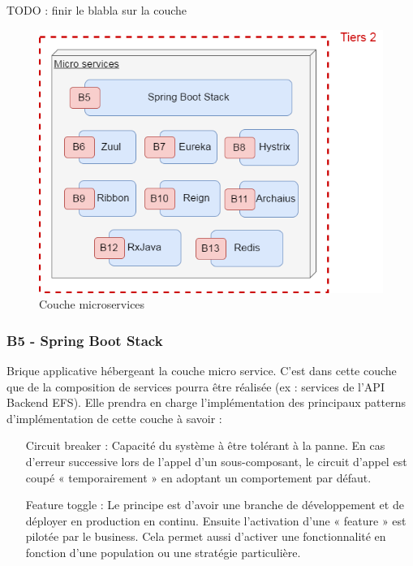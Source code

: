 	TODO : finir le blabla sur la couche
	
\begin{figure}[H]
	\includegraphics[scale=0.5]{images/travailNeuflizeOBC/architecture/coucheMicroservices.png}
	\centering
	\caption{Couche microservices}
	\label{coucheMicroservices}
\end{figure}

	\subsubsection{B5 - Spring Boot Stack}
	
Brique applicative hébergeant la couche micro service. C’est dans cette couche que de la composition de services pourra être réalisée (ex : services de l’API Backend EFS). Elle prendra en charge l’implémentation des principaux patterns d’implémentation de cette couche à savoir :
\begin{itemize}
	\item[Circuit breaker] : Capacité du système à être tolérant à la panne. En cas d’erreur successive lors de l’appel d’un sous-composant, le circuit d’appel est coupé « temporairement » en adoptant un comportement par défaut. 
	\item[Feature toggle] : Le principe est d’avoir une branche de développement et de déployer en production en continu. Ensuite l’activation d’une « feature » est pilotée par le business. Cela permet aussi d’activer une fonctionnalité en fonction d’une population ou une stratégie particulière. \\
\end{itemize}
	
